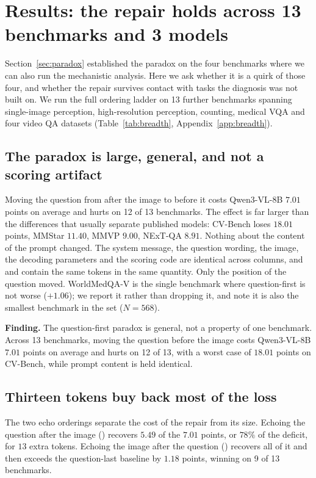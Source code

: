 \section{Results: the repair holds across 13 benchmarks and 3 models}
\label{sec:results}

Section~\ref{sec:paradox} established the paradox on the four benchmarks where we
can also run the mechanistic analysis. Here we ask whether it is a quirk of those
four, and whether the repair survives contact with tasks the diagnosis was not
built on. We run the full ordering ladder on 13 further benchmarks spanning
single-image perception, high-resolution perception, counting, medical VQA and
four video QA datasets (Table~\ref{tab:breadth}, Appendix~\ref{app:breadth}).

\subsection{The paradox is large, general, and not a scoring artifact}

Moving the question from after the image to before it costs Qwen3-VL-8B $7.01$
points on average and hurts on 12 of 13 benchmarks. The effect is far larger than
the differences that usually separate published models: CV-Bench loses $18.01$
points, MMStar $11.40$, MMVP $9.00$, NExT-QA $8.91$. Nothing about the content of
the prompt changed. The system message, the question wording, the image, the
decoding parameters and the scoring code are identical across columns, and
\sti{} and \sit{} contain the same tokens in the same quantity. Only the position
of the question moved. WorldMedQA-V is the single benchmark where question-first
is not worse ($+1.06$); we report it rather than dropping it, and note it is also
the smallest benchmark in the set ($N = 568$).

\begin{finding}
\textbf{Finding.} The question-first paradox is general, not a property of one
benchmark. Across 13 benchmarks, moving the question before the image costs
Qwen3-VL-8B $7.01$ points on average and hurts on 12 of 13, with a worst case of
$18.01$ points on CV-Bench, while prompt content is held identical.
\end{finding}

\subsection{Thirteen tokens buy back most of the loss}

The two echo orderings separate the cost of the repair from its size. Echoing
the question after the image (\stit{}) recovers $5.49$ of the $7.01$ points, or
$78\%$ of the deficit, for $13$ extra tokens. Echoing the image after the
question (\sitit{}) recovers all of it and then exceeds the question-last
baseline by $1.18$ points, winning on 9 of 13 benchmarks.

